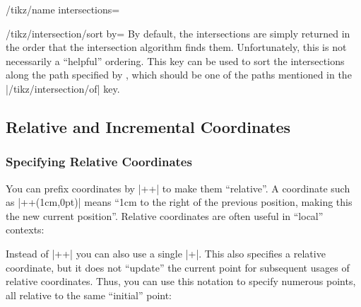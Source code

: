 \begin{key}{/tikz/name intersections=}
    \begin{key}{/tikz/intersection/sort by=}
        By default, the intersections are simply returned in the order that the
        intersection algorithm finds them. Unfortunately, this is not
        necessarily a ``helpful'' ordering. This key can be used to sort the
        intersections along the path specified by , which
        should be one of the paths mentioned in the |/tikz/intersection/of|
        key.
\begin{codeexample}[]
\end{codeexample}
    \end{key}
\end{key}


\subsection{Relative and Incremental Coordinates}

\subsubsection{Specifying Relative Coordinates}

You can prefix coordinates by |++| to make them ``relative''. A coordinate such
as |++(1cm,0pt)| means ``1cm to the right of the previous position, making this
the new current position''. Relative coordinates are often useful in ``local''
contexts:
%
\begin{codeexample}[]
\end{codeexample}

Instead of |++| you can also use a single |+|. This also specifies a relative
coordinate, but it does not ``update'' the current point for subsequent usages
of relative coordinates. Thus, you can use this notation to specify numerous
points, all relative to the same ``initial'' point:

